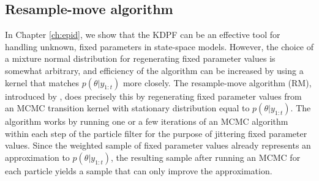 \subsection{Resample-move algorithm} \label{sec:rm}

In Chapter \ref{ch:epid}, we show that the KDPF can be an effective tool for handling unknown, fixed parameters in state-space models. However, the choice of a mixture normal distribution for regenerating fixed parameter values is somewhat arbitrary, and efficiency of the algorithm can be increased by using a kernel that matches $p(\theta|y_{1:t})$ more closely. The resample-move algorithm (RM), introduced by \citet{Gilk:Berz:foll:2001}, does precisely this by regenerating fixed parameter values from an MCMC transition kernel with stationary distribution equal to $p(\theta|y_{1:t})$. The algorithm works by running one or a few iterations of an MCMC algorithm within each step of the particle filter for the purpose of jittering fixed parameter values. Since the weighted sample of fixed parameter values already represents an approximation to $p(\theta|y_{1:t})$, the resulting sample after running an MCMC for each particle yields a sample that can only improve the approximation.

